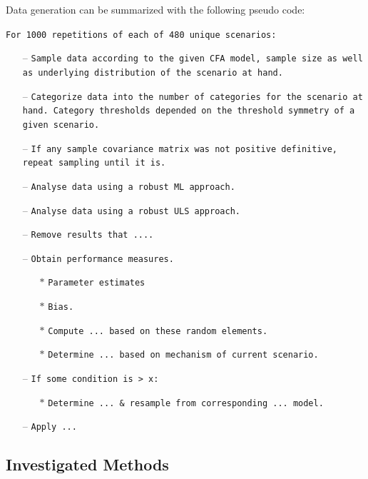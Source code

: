 \documentclass[10,a4paperpaper,]{article}
\begin{document}
\begin{minipage}{\linewidth}
Data generation can be summarized with the following pseudo code:

\texttt{For 1000 repetitions of each of 480 unique scenarios:}
\begin{itemize}[leftmargin=*] 
    \item[--] \texttt{Sample data according to the given CFA model, sample size as well as underlying distribution of the scenario at hand.}
    \item[--] \texttt{Categorize data into the number of categories for the scenario at hand. Category thresholds depended on the threshold symmetry of a given scenario.}
    \item[--] \texttt{If any sample covariance matrix was not positive definitive, repeat sampling until it is.}
        \item[--] \texttt{Analyse data using a robust ML approach.}
        \item[--] \texttt{Analyse data using a robust ULS approach.}
        \item[--] \texttt{Remove results that ....}
        \item[--] \texttt{Obtain performance measures.}
    \begin{itemize}
      \item[$\ast$] \texttt{Parameter estimates}
      \item[$\ast$] \texttt{Bias.}
      \item[$\ast$] \texttt{Compute ... based on these random elements.}
      \item[$\ast$] \texttt{Determine ... based on mechanism of current scenario.}
    \end{itemize}
    \item[--] \texttt{If some condition is > x:}
    \begin{itemize}
      \item[$\ast$] \texttt{Determine ... \& resample from corresponding ... model.}
    \end{itemize}
    \item[--] \texttt{Apply ...}
\end{itemize}
\end{minipage}
\newpage

\FloatBarrier 

\subsection{Investigated Methods}
\end{document}
